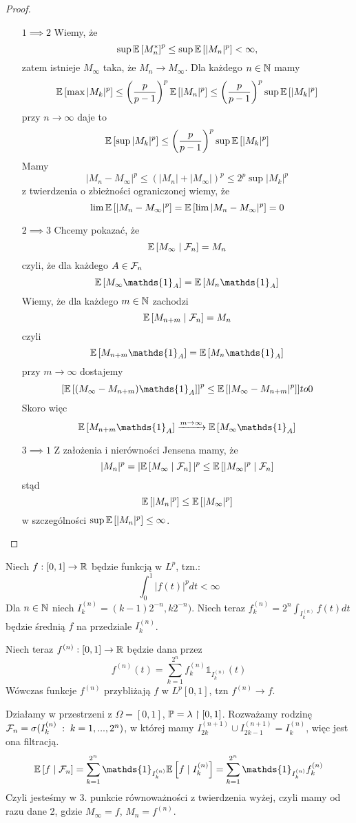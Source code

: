 \begin{proof}
  \begin{itemize}
    \item[$1\implies 2$] Wiemy, że
      $$\sup\expected{M_n^*}^p\leq\sup\expected{|M_n|^p}<\infty,$$
      zatem istnieje $M_\infty$ taka, że $M_n\to M_\infty$. Dla każdego $n\in\operatorname{\mathbb{N}}$ mamy
      $$\expected{\max|M_k|^p}\leq\left(\frac{p}{p-1}\right)^p\expected{|M_n|^p}\leq \left(\frac{p}{p-1}\right)^p\sup\expected{|M_k|^p}$$
      przy $n\to\infty$ daje to
      $$\expected{\sup |M_k|^p}\leq\left(\frac{p}{p-1}\right)^p\sup\expected{|M_k|^p}$$
      Mamy
      $$|M_n-M_\infty|^p\leq (|M_n|+|M_\infty|)^p \leq2^p\sup|M_k|^p$$
      z twierdzenia o zbieżności ograniczonej wiemy, że
      $$\lim\expected{|M_n-M_\infty|^p}=\expected{\lim|M_n-M_\infty|^p}=0$$
    \item[$2\implies3$] Chcemy pokazać, że
      $$\expected{M_\infty}{\set{F}_n}=M_n$$
      czyli, że dla każdego $A\in\mathcal{F}_n$
      $$\expected{M_\infty\mathds{1}_A}=\expected{M_n\mathds{1}_A}$$
      Wiemy, że dla każdego $m\in\operatorname{\mathbb{N}}$ zachodzi
      $$\expected{M_{n+m}}{\set{F}_n}=M_n$$
      czyli
      $$\expected{M_{n+m}\mathds{1}_A}=\expected{M_n\mathds{1}_A}$$
      przy $m\to \infty$ dostajemy
      $$\left[\expected{(M_\infty-M_{n+m})\mathds{1}_A}\right]^p\leq\expected{|M_\infty-M_{n+m}|^p}]to 0$$
      Skoro więc
      $$\expected{M_{n+m}\mathds{1}_A}\xrightarrow{m\to\infty} \expected{M_\infty\mathds{1}_A}$$
    \item[$3\implies 1$] Z założenia i nierówności Jensena mamy, że
      $$|M_n|^p=|\expected{M_\infty}{\set{F}_n}|^p\leq\expected{|M_\infty|^p}{\set{F}_n}$$
      stąd
      $$\expected{|M_n|^p}\leq\expected{|M_\infty|^p}$$
      w szczególności $\sup\expected{|M_n|^p}\leq\infty$.
  \end{itemize}
\end{proof}

\begin{example}
\item Niech $f:[0,1]\to\operatorname{\mathbb{R}}$ będzie funkcją w $L^p$, tzn.:
  $$\int_0^1|f(t)|^pdt<\infty$$
  Dla $n\in\operatorname{\mathbb{N}}$ niech $I_k^{(n)}=(k-1)2^{-n}, k2^{-n})$. Niech teraz $f_k^{(n)}=2^n\int_{I_k^{(n)}}f(t)dt$ będzie średnią $f$ na przedziale $I_k^{(n)}$.

  Niech teraz $f^{(n)}:[0,1]\to\operatorname{\mathbb{R}}$ będzie dana przez
  $$f^{(n)}(t)=\sum_{k=1}^{2^n}f_k^{(n)}\mathds{1}_{I_k^{(n)}}(t)$$
  Wówczas funkcje $f^{(n)}$ przybliżają $f$ w $L^p[0,1]$, tzn $f^{(n)}\to f$.

  Działamy w przestrzeni z $\Omega=[0,1]$, $\prob=\lambda\restriction[0,1]$. Rozważamy rodzinę  $\mathcal{F}_n=\sigma(I_k^{(n)}\;:\;k=1,...,2^n)$, w której mamy $I_{2k}^{(n+1)}\cup I_{2k-1}^{(n+1)}=I_k^{(n)}$, więc jest ona filtracją. 
  $$\expected{f}{\set{F}_n}=\sum_{k=1}^{2^n}\mathds{1}_{I_k^{(n)}}\expected{f}{I_k^{(n)}}=\sum_{k=1}^{2^n}\mathds{1}_{I_k^{(n)}}f_k^{(n)}$$
  Czyli jesteśmy w 3. punkcie równoważności z twierdzenia wyżej, czyli mamy od razu dane 2, gdzie $M_\infty=f$, $M_n=f^{(n)}$.
\end{example}
